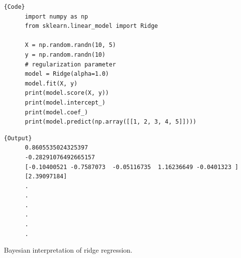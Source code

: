   \begin{code}
    \noindent\begin{minipage}{.6\textwidth}
    \begin{lstlisting}[]{Code}
      import numpy as np 
      from sklearn.linear_model import Ridge  

      X = np.random.randn(10, 5) 
      y = np.random.randn(10)
      # regularization parameter
      model = Ridge(alpha=1.0)  
      model.fit(X, y) 
      print(model.score(X, y))  
      print(model.intercept_)
      print(model.coef_) 
      print(model.predict(np.array([[1, 2, 3, 4, 5]]))) 
    \end{lstlisting}
    \end{minipage}
    \hfill
    \begin{minipage}{.39\textwidth}
    \begin{lstlisting}[]{Output}
      0.8605535024325397
      -0.28291076492665157
      [-0.10400521 -0.7587073  -0.05116735  1.16236649 -0.0401323 ]
      [2.39097184]
      .
      .
      .
      .
      .
      .
    \end{lstlisting}
    \end{minipage}
  \end{code}

  \begin{question}[To Do]
    Bayesian interpretation of ridge regression. 
  \end{question}

